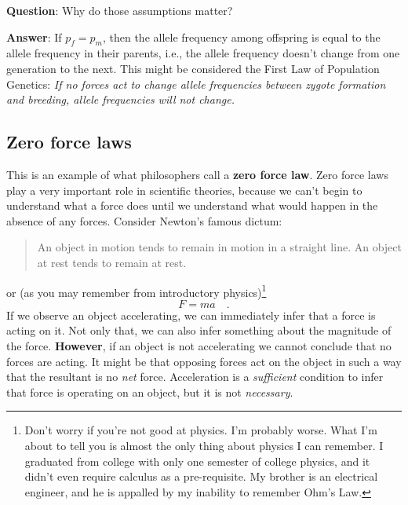 {\bf Question}: Why do those assumptions matter?

{\bf Answer}: If $p_f = p_m$, then the allele frequency among
offspring is equal to the allele frequency in their parents, i.e., the
allele frequency doesn't change from one generation to the next. This
might be considered the First Law of Population Genetics: {\it If no
  forces act to change allele frequencies between zygote formation and
  breeding, allele frequencies will not change.}

\subsection*{Zero force laws}

This is an example of what philosophers call a {\bf zero force
law}. Zero force laws play a very important role in scientific
theories, because we can't begin to understand what a force does until
we understand what would happen in the absence of any forces. Consider
Newton's famous dictum: 
\begin{quotation}
\noindent An object in motion tends to remain in motion in a straight
line. An object at rest tends to remain at rest.
\end{quotation}
or (as you may remember from introductory physics)\footnote{Don't
  worry if you're not good at physics. I'm probably worse. What I'm
  about to tell you is almost the only thing about physics I can
  remember. I graduated from college with only one semester of college
  physics, and it didn't even require calculus as a pre-requisite. My
  brother is an electrical engineer, and he is appalled by my
  inability to remember Ohm's Law.}
\[
F = ma \quad.
\]
\noindent If we observe an object accelerating, we can immediately
infer that a force is acting on it. Not only that, we can also infer
something about the magnitude of the force.  {\bf However}, if an
object is not accelerating we cannot conclude that no forces are
acting. It might be that opposing forces act on the object in such a
way that the resultant is no {\it net\/} force. Acceleration is a {\it
  sufficient\/} condition to infer that force is operating on an
object, but it is not {\it necessary}.


